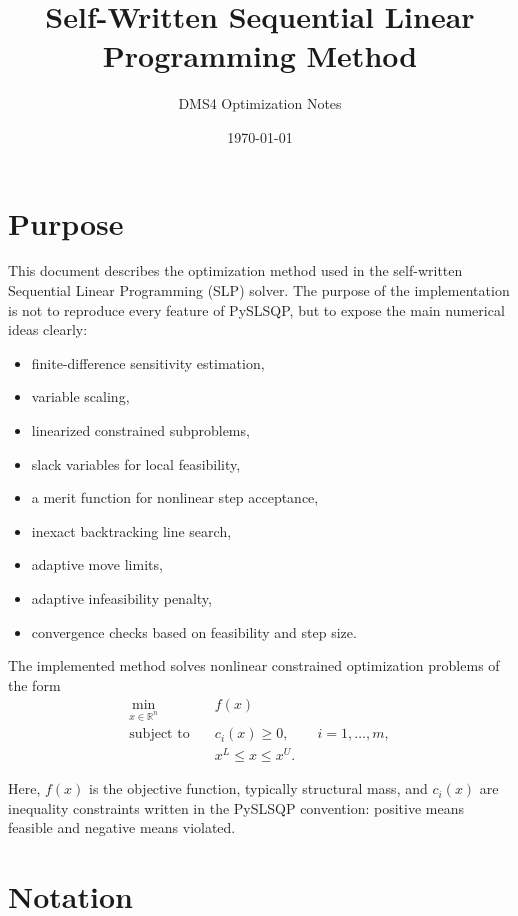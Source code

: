 \documentclass[11pt,a4paper]{article}
\title{Self-Written Sequential Linear Programming Method}
\author{DMS4 Optimization Notes}
\date{\today}
\begin{document}
\maketitle

\section{Purpose}

This document describes the optimization method used in the self-written
Sequential Linear Programming (SLP) solver. The purpose of the implementation is
not to reproduce every feature of PySLSQP, but to expose the main numerical
ideas clearly:

\begin{itemize}[nosep]
    \item finite-difference sensitivity estimation,
    \item variable scaling,
    \item linearized constrained subproblems,
    \item slack variables for local feasibility,
    \item a merit function for nonlinear step acceptance,
    \item inexact backtracking line search,
    \item adaptive move limits,
    \item adaptive infeasibility penalty,
    \item convergence checks based on feasibility and step size.
\end{itemize}

The implemented method solves nonlinear constrained optimization problems of the
form
\begin{align}
    \min_{x \in \mathbb{R}^n} \quad & f(x) \\
    \text{subject to} \quad & c_i(x) \geq 0, \qquad i = 1,\dots,m, \\
    & x^L \leq x \leq x^U.
\end{align}

Here, \(f(x)\) is the objective function, typically structural mass, and
\(c_i(x)\) are inequality constraints written in the PySLSQP convention:
positive means feasible and negative means violated.

\section{Notation}
\end{document}
